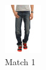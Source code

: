\begin{figure}[H]
    \centering
    \begin{subfigure}[b]{0.19\textwidth}
        \includegraphics[width=\textwidth]{images/output1.jpeg}
        \caption{Match 1}
    \end{subfigure}
    \begin{subfigure}[b]{0.19\textwidth}

\end{subfigure}
\end{figure}
